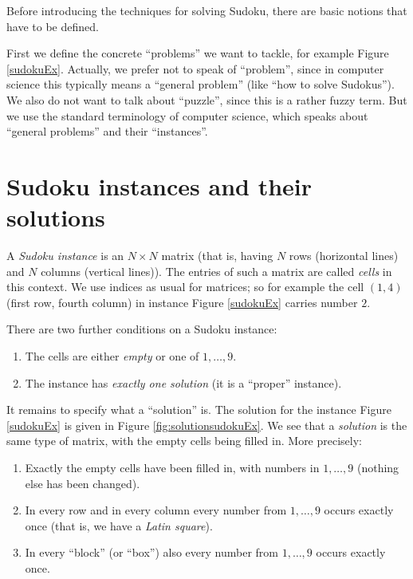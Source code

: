 \documentclass[11pt]{report}
\begin{document}
Before introducing the techniques for solving Sudoku, there are basic notions that have to be defined.

First we define the concrete ``problems'' we want to tackle, for example Figure \ref{sudokuEx}. Actually, we prefer not to speak of ``problem'', since in computer science this typically means a ``general problem'' (like ``how to solve Sudokus''). We also do not want to talk about ``puzzle'', since this is a rather fuzzy term. But we use the standard terminology of computer science, which speaks about ``general problems'' and their ``instances''.


\section{Sudoku instances and their solutions}
\label{sec:Sudokuinstances}

A \textit{Sudoku instance} is an $N \times N$ matrix (that is, having $N$ rows (horizontal lines) and $N$ columns (vertical lines)). The entries of such a matrix are called \textit{cells} in this context. We use indices as usual for matrices; so for example the cell $(1,4)$ (first row, fourth column) in instance Figure \ref{sudokuEx} carries number $2$.

There are two further conditions on a Sudoku instance:
\begin{enumerate}
\item The cells are either \emph{empty} or one of $1, \dots, 9$.
\item The instance has \emph{exactly one solution} (it is a ``proper'' instance).
\end{enumerate}

It remains to specify what a ``solution'' is. The solution for the instance Figure \ref{sudokuEx} is given in Figure \ref{fig:solutionsudokuEx}. We see that a \textit{solution} is the same type of matrix, with the empty cells being filled in. More precisely:
\begin{enumerate}
\item Exactly the empty cells have been filled in, with numbers in $1,\dots,9$ (nothing else has been changed).
\item In every row and in every column every number from $1,\dots,9$ occurs exactly once (that is, we have a \emph{Latin square}).
\item In every ``block'' (or ``box'') also every number from $1,\dots,9$ occurs exactly once.
\end{enumerate}
\end{document}
